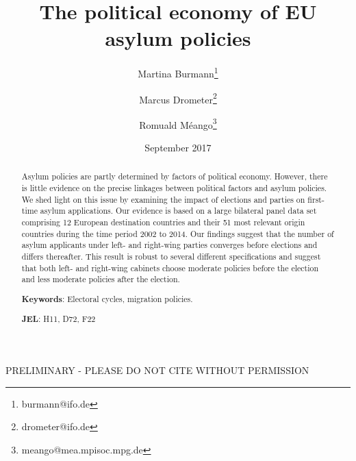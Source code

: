 \documentclass[a4paper,12pt]{article}
\title{The political economy of EU asylum policies}
\date{September 2017}
\author[,1]{Martina Burmann\thanks{burmann@ifo.de}}
\author[,1]{Marcus Drometer\thanks{drometer@ifo.de}}
\author[,2]{Romuald M\'eango\thanks{meango@mea.mpisoc.mpg.de}}
\affil[1]{ifo Institute for Economic Research, Munich}
\affil[2]{Munich Center for the Economics of Aging (MEA)}
\begin{document}
      \maketitle

\begin{center}
PRELIMINARY - PLEASE DO NOT CITE WITHOUT PERMISSION
\end{center}
\begin{abstract}
\singlespacing
\noindent 
Asylum policies are partly determined by factors of political economy. However, there is little evidence on the precise linkages between political factors and asylum policies. We shed light on this issue by examining the impact of elections and parties on first-time asylum applications.  Our evidence is based on a large bilateral panel data set comprising 12 European destination countries and their 51 most relevant origin countries during the time period 2002 to 2014. Our findings suggest that  the number of asylum applicants under left- and right-wing parties converges before elections and differs thereafter. This result is robust to several different specifications and suggest that both left- and right-wing cabinets choose moderate policies before the election and less moderate policies after the election.
% 
% 
\bigskip

\textbf{Keywords}: Electoral cycles, migration policies.

\textbf{JEL}: H11, D72, F22

\bigskip
\end{abstract}
\setcounter{page}{0} \renewcommand{\thepage}{}
\pagebreak{}\pagebreak

\end{document}
